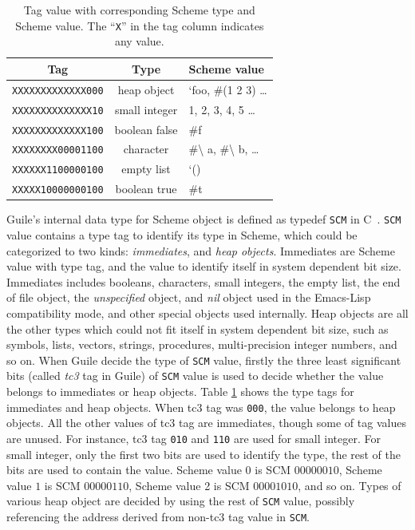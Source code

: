 \documentclass[preprint, 10pt]{sigplanconf}
\begin{document}
\begin{table}
  \begin{center}
  \begin{tabular}{ccl}
    \toprule
    Tag&Type&Scheme value\\
    \midrule
    \texttt{XXXXXXXXXXXXX000} & heap object & `foo, \#(1 2 3) \ldots \\
    \texttt{XXXXXXXXXXXXXX10} & small integer & 1, 2, 3, 4, 5 \ldots \\
    \texttt{XXXXXXXXXXXXX100} & boolean false & \#f \\
    \texttt{XXXXXXXX00001100} & character & \#\textbackslash{} a,
    \#\textbackslash{} b, \ldots \\
    \texttt{XXXXXX1100000100} & empty list & `() \\
    \texttt{XXXXX10000000100} & boolean true & \#t \\
    \bottomrule
  \end{tabular}
  \end{center}
  \caption{Tag value with corresponding Scheme type and Scheme value. The
    ``\texttt{X}'' in the tag column indicates any value.}
\label{tab:tags}
\end{table}

Guile's internal data type for Scheme object is defined as typedef \texttt{SCM}
in C~\cite{Galassi02guilereference}. \texttt{SCM} value contains a type tag to
identify its type in Scheme, which could be categorized to two kinds:
\textit{immediates}, and \textit{heap objects}. Immediates are Scheme value with
type tag, and the value to identify itself in system dependent bit
size. Immediates includes booleans, characters, small integers, the empty list,
the end of file object, the \textit{unspecified} object, and \textit{nil} object
used in the Emacs-Lisp compatibility mode, and other special objects used
internally. Heap objects are all the other types which could not fit itself in
system dependent bit size, such as symbols, lists, vectors, strings, procedures,
multi-precision integer numbers, and so on.  When Guile decide the type of
\texttt{SCM} value, firstly the three least significant bits (called
\textit{tc3} tag in Guile) of \texttt{SCM} value is used to decide whether the
value belongs to immediates or heap objects. Table
\hyperref[tab:tags]{\ref{tab:tags}} shows the type tags for immediates and heap
objects. When tc3 tag was \texttt{000}, the value belongs to heap objects. All
the other values of tc3 tag are immediates, though some of tag values are
unused. For instance, tc3 tag \texttt{010} and \texttt{110} are used for small
integer. For small integer, only the first two bits are used to identify the
type, the rest of the bits are used to contain the value. Scheme value $0$ is
SCM $00000010$, Scheme value $1$ is SCM $00000110$, Scheme value 2 is SCM
$00001010$, and so on. Types of various heap object are decided by using the
rest of \texttt{SCM} value, possibly referencing the address derived from
non-tc3 tag value in \texttt{SCM}.
\end{document}
